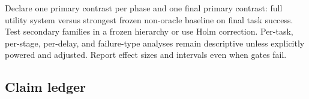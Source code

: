 Declare one primary contrast per phase and one final primary contrast: full utility system versus strongest frozen non-oracle baseline on final task success. Test secondary families in a frozen hierarchy or use Holm correction. Per-task, per-stage, per-delay, and failure-type analyses remain descriptive unless explicitly powered and adjusted. Report effect sizes and intervals even when gates fail.


\subsection{Claim ledger}

